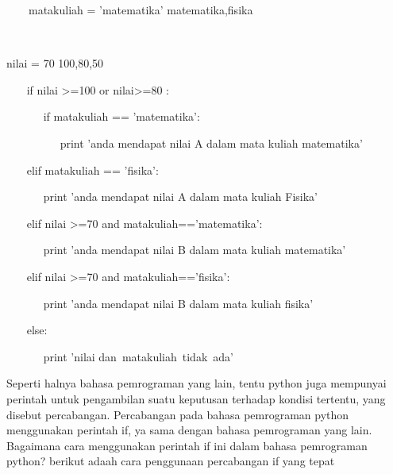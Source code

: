 \vspace{12pt}
\noindent 
~~~~matakuliah = 'matematika'   matematika,fisika \par
\noindent 
~~  \par
\noindent 
 nilai = 70 100,80,50 \par
\vspace{12pt}
\noindent 
~~~ if nilai >=100 or nilai>=80 : \par
\vspace{12pt}
\noindent 
~~~~~~ if matakuliah == 'matematika': \par
\vspace{12pt}
\noindent 
~~~~~~~~~ print 'anda mendapat nilai A dalam mata kuliah matematika' \par
\vspace{12pt}
\noindent 
~~~ elif matakuliah == 'fisika': \par
\vspace{12pt}
\noindent 
~~~~~~ print 'anda mendapat nilai A dalam mata kuliah Fisika' \par
\vspace{12pt}
\noindent 
~~~ elif nilai >=70 and matakuliah=='matematika': \par
\vspace{12pt}
\vspace{12pt}
\noindent 
~~~~~~ print 'anda mendapat nilai B dalam mata kuliah matematika' \par
\vspace{12pt}
\noindent 
~~~ elif nilai >=70 and matakuliah=='fisika': \par
\vspace{12pt}
\noindent 
~~~~~~ print 'anda mendapat nilai B dalam mata kuliah fisika' \par
\vspace{12pt}
\noindent 
~~~ else: \par
\vspace{12pt}
\noindent 
~~~~~~ print 'nilai dan~matakuliah~tidak~ada'~~~     \par
\vspace{12pt}
\noindent 
Seperti halnya bahasa pemrograman yang lain, tentu python juga mempunyai perintah untuk pengambilan suatu keputusan terhadap kondisi tertentu, yang disebut percabangan. Percabangan pada bahasa pemrograman python menggunakan perintah if, ya sama dengan bahasa pemrograman yang lain. Bagaimana cara menggunakan perintah if ini dalam bahasa pemrograman python? berikut adaah cara penggunaan percabangan if yang tepat\par
